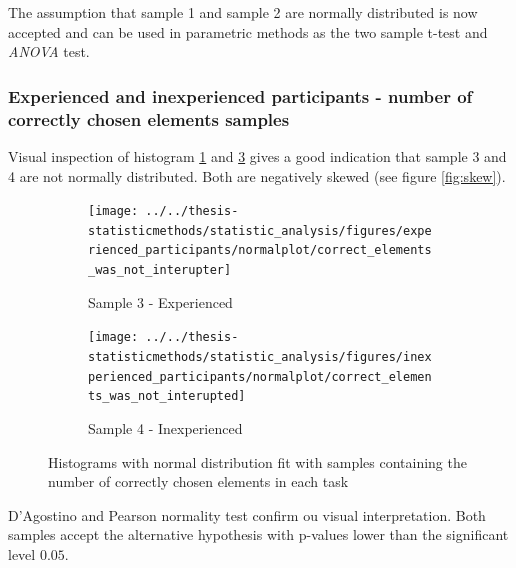 The assumption that sample 1 and sample 2 are normally distributed is now accepted and can be used in parametric methods as the two sample t-test and \textit{ANOVA} test.

\subsubsection[Sample 3 and 4]{Experienced and inexperienced participants - number of correctly chosen elements samples}\label{sec:correct_ex_inex}
Visual inspection of histogram \ref{fig:correctelementswasnotinterupter_ex} and \ref{fig:correctelementswasnotinterupted_inex} gives a good indication that sample 3 and 4 are not normally distributed. Both are negatively skewed (see figure \ref{fig:skew}).   

\begin{figure}[h!]
	\centering
	\begin{subfigure}[b]{0.48\textwidth}
		\centering
		\texttt{[image: ../../thesis-statisticmethods/statistic\_analysis/figures/experienced\_participants/normalplot/correct\_elements\_was\_not\_interupter]}
		\caption{Sample 3 - Experienced}
		\label{fig:correctelementswasnotinterupter_ex}
	\end{subfigure}
	\begin{subfigure}[b]{0.48\textwidth}
		\centering
		\texttt{[image: ../../thesis-statisticmethods/statistic\_analysis/figures/inexperienced\_participants/normalplot/correct\_elements\_was\_not\_interupted]}
		\caption{Sample 4 - Inexperienced}
		\label{fig:correctelementswasnotinterupted_inex}
	\end{subfigure}
	\caption{Histograms with normal distribution fit with samples containing the number of correctly chosen elements in each task}
\end{figure}

D'Agostino and Pearson normality test confirm ou visual interpretation. Both samples accept the alternative hypothesis with p-values lower than the significant level $0.05$. \\[0.5cm]


